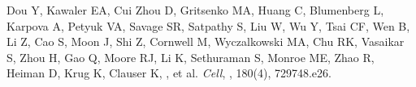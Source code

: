 \documentclass[11pt]{article}
\begin{document}
\begin{publicationlist}
  \publicationitem Dou Y, Kawaler EA, Cui Zhou D, Gritsenko MA, Huang C, Blumenberg L, Karpova A, Petyuk VA, Savage SR, Satpathy S, Liu W, Wu Y, Tsai CF, Wen B, Li Z, Cao S, Moon J, Shi Z, Cornwell M, Wyczalkowski MA, Chu RK, Vasaikar S, Zhou H, Gao Q, Moore RJ, Li K, Sethuraman S, Monroe ME, Zhao R, Heiman D, Krug K, Clauser K, , et al.  \textit{Cell}, , 180(4), 729\textendash{}748.e26. 
\end{publicationlist}
\end{document}
